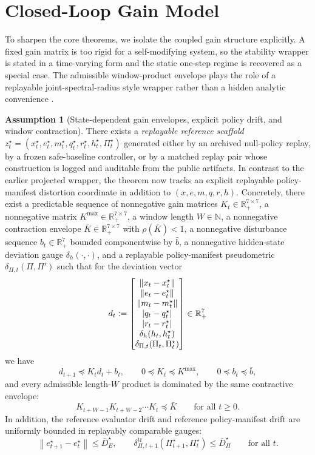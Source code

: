 \documentclass[11pt]{article}
\theoremstyle{definition}
\newtheorem{assumption}[theorem]{Assumption}
\newcommand{\R}{\mathbb{R}}
\newcommand{\N}{\mathbb{N}}
\newcommand{\1}{\mathbf{1}}
\newcommand{\norm}[1]{\left\lVert #1 \right\rVert}
\newcommand{\abs}[1]{\left\lvert #1 \right\rvert}
\newcommand{\Defeq}{\vcentcolon=}
\begin{document}
\section{Closed-Loop Gain Model}
To sharpen the core theorems, we isolate the coupled gain structure explicitly. A fixed gain matrix is too rigid for a self-modifying system, so the stability wrapper is stated in a time-varying form and the static one-step regime is recovered as a special case. The admissible window-product envelope plays the role of a replayable joint-spectral-radius style wrapper rather than a hidden analytic convenience \cite{Jungers2009}.


\begin{assumption}[State-dependent gain envelopes, explicit policy drift, and window contraction]\label{ass:gain_matrix}
There exists a \emph{replayable reference scaffold} $z_t^\star=(x_t^\star,e_t^\star,m_t^\star,q_t^\star,r_t^\star,h_t^\star,\Pi_t^\star)$ generated either by an archived null-policy replay, by a frozen safe-baseline controller, or by a matched replay pair whose construction is logged and auditable from the public artifacts. In contrast to the earlier projected wrapper, the theorem now tracks an explicit replayable policy-manifest distortion coordinate in addition to $(x,e,m,q,r,h)$. Concretely, there exist a predictable sequence of nonnegative gain matrices $K_t\in\R_+^{7\times 7}$, a nonnegative matrix $K^{\max}\in\R_+^{7\times 7}$, a window length $W\in\N$, a nonnegative contraction envelope $\bar K\in\R_+^{7\times 7}$ with $\rho(\bar K)<1$, a nonnegative disturbance sequence $b_t\in\R_+^7$ bounded componentwise by $\bar b$, a nonnegative hidden-state deviation gauge $\delta_h(\cdot,\cdot)$, and a replayable policy-manifest pseudometric $\delta_{\Pi,t}(\Pi,\Pi')$ such that for the deviation vector
\[
d_t\Defeq \begin{bmatrix}
\norm{x_t-x_t^\star}\\
\norm{e_t-e_t^\star}\\
\norm{m_t-m_t^\star}\\
\abs{q_t-q_t^\star}\\
\abs{r_t-r_t^\star}\\
\delta_h(h_t,h_t^\star)\\
\delta_{\Pi,t}(\Pi_t,\Pi_t^\star)
\end{bmatrix}\in\R_+^7
\]
we have
\[
d_{t+1}\preceq K_t d_t + b_t,
\qquad
0\preceq K_t\preceq K^{\max},
\qquad
0\preceq b_t\preceq \bar b,
\]
and every admissible length-$W$ product is dominated by the same contractive envelope:
\[
K_{t+W-1}K_{t+W-2}\cdots K_t \preceq \bar K
\qquad\text{for all }t\ge 0.
\]
In addition, the reference evaluator drift and reference policy-manifest drift are uniformly bounded in replayably comparable gauges:
\[
\norm{e_{t+1}^\star-e_t^\star}\le \bar D_E^\star,
\qquad
\delta_{\Pi,t+1}^{\mathrm{tr}}(\Pi_{t+1}^\star,\Pi_t^\star)\le \bar D_\Pi^\star
\qquad\text{for all }t.
\]
\end{assumption}
\end{document}
